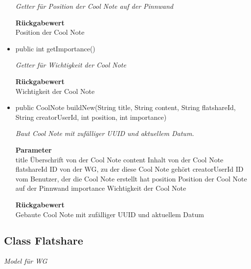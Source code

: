 \documentclass[a4paper]{scrreprt}
\begin{document}
\begin{itemize}
        	\textit{Getter für Position der Cool Note auf der Pinnwand}
        	
        	
        	
        	\textbf{Rückgabewert} \\
        	Position der Cool Note        \item{public int getImportance()}
        	
        	\textit{Getter für Wichtigkeit der Cool Note}
        	
        	
        	
        	\textbf{Rückgabewert} \\
        	Wichtigkeit der Cool Note        \item{public CoolNote buildNew(String title, String content, String flatshareId, String creatorUserId, int position, int importance)}
        	
        	\textit{Baut Cool Note mit zufälliger UUID und aktuellem Datum.}
        	
        	\textbf{Parameter} \\
        	title Überschrift von der Cool Note
        	content Inhalt von der Cool Note
        	flatshareId ID von der WG, zu der diese Cool Note gehört
        	creatorUserId ID vom Benutzer, der die Cool Note erstellt hat
        	position Position der Cool Note auf der Pinnwand
        	importance Wichtigkeit der Cool Note
        	
        	\textbf{Rückgabewert} \\
        	Gebaute Cool Note mit zufälliger UUID und aktuellem Datum
        \end{itemize}
        \subsection{Class Flatshare}
        \textit{Model für WG}
\end{document}
